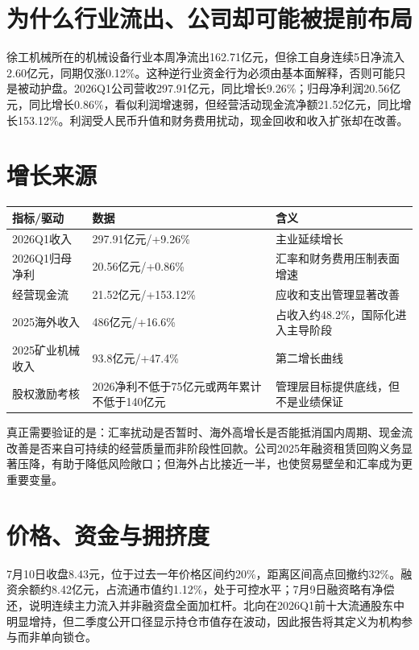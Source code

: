 \section{为什么行业流出、公司却可能被提前布局}

徐工机械所在的机械设备行业本周净流出162.71亿元，但徐工自身连续5日净流入2.60亿元，同期仅涨0.12\%。这种逆行业资金行为必须由基本面解释，否则可能只是被动护盘。2026Q1公司营收297.91亿元，同比增长9.26\%；归母净利润20.56亿元，同比增长0.86\%，看似利润增速弱，但经营活动现金流净额21.52亿元，同比增长153.12\%。利润受人民币升值和财务费用扰动，现金回收和收入扩张却在改善。

\section{增长来源}

\begin{exhibitbox}
\begin{tabularx}{\textwidth}{L{3.4cm}R{2.4cm}X}
\toprule
\textbf{指标/驱动} & \textbf{数据} & \textbf{含义} \\
\midrule
2026Q1收入 & 297.91亿元/+9.26\% & 主业延续增长 \\
2026Q1归母净利 & 20.56亿元/+0.86\% & 汇率和财务费用压制表面增速 \\
经营现金流 & 21.52亿元/+153.12\% & 应收和支出管理显著改善 \\
2025海外收入 & 486亿元/+16.6\% & 占收入约48.2\%，国际化进入主导阶段 \\
2025矿业机械收入 & 93.8亿元/+47.4\% & 第二增长曲线 \\
股权激励考核 & 2026净利不低于75亿元或两年累计不低于140亿元 & 管理层目标提供底线，但不是业绩保证 \\
\bottomrule
\end{tabularx}
\end{exhibitbox}

真正需要验证的是：汇率扰动是否暂时、海外高增长是否能抵消国内周期、现金流改善是否来自可持续的经营质量而非阶段性回款。公司2025年融资租赁回购义务显著压降，有助于降低风险敞口；但海外占比接近一半，也使贸易壁垒和汇率成为更重要变量。

\section{价格、资金与拥挤度}

7月10日收盘8.43元，位于过去一年价格区间约20\%，距离区间高点回撤约32\%。融资余额约8.42亿元，占流通市值约1.12\%，处于可控水平；7月9日融资略有净偿还，说明连续主力流入并非融资盘全面加杠杆。北向在2026Q1前十大流通股东中明显增持，但二季度公开口径显示持仓市值存在波动，因此报告将其定义为机构参与而非单向锁仓。


